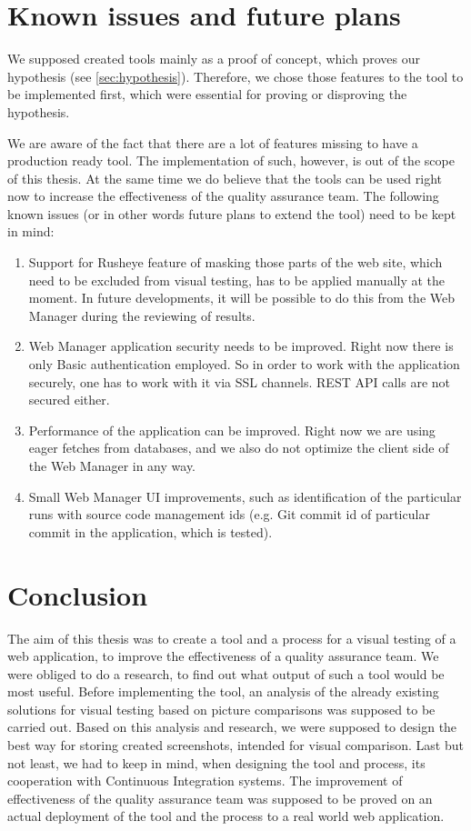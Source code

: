 \documentclass[11pt,oneside,final]{fithesis2}
\begin{document}
\chapter{Known issues and future plans}
We supposed created tools mainly as a proof of concept, which proves our hypothesis (see \ref{sec:hypothesis}). Therefore, we chose those features
to the tool to be implemented first, which were essential for proving or disproving the hypothesis.

We are aware of the fact that there are a lot of features missing to have a production ready tool. The implementation of such, however, is out
of the scope of this thesis. At the same time we do believe that the tools can be used right now to increase the effectiveness of the quality assurance
team. The following known issues (or in other words future plans to extend the tool) need to be kept in mind:

\begin{enumerate}
 \item Support for Rusheye feature of masking those parts of the web site, which need to be excluded from visual testing, has to be applied
 manually at the moment. In future developments, it will be possible to do this from the Web Manager during the reviewing of results.
 \item Web Manager application security needs to be improved. Right now there is only Basic authentication employed. So in order to work
 with the application securely, one has to work with it via SSL channels. REST API calls are not secured either.
 \item Performance of the application can be improved. Right now we are using eager fetches from databases, and we also do not optimize
 the client side of the Web Manager in any way.
 \item Small Web Manager UI improvements, such as identification of the particular runs with source code management ids (e.g. Git commit id of
 particular commit in the application, which is tested).
\end{enumerate}


\label{sec:plannedExtensions}
  
\chapter{Conclusion}
The aim of this thesis was to create a tool and a process for a visual testing of a web application, to improve the effectiveness of a 
quality assurance team. We were obliged to do a research, to find out what output of such a tool would be most useful. Before implementing
the tool, an analysis of the already existing solutions for visual testing based on picture comparisons was supposed to be carried out.
Based on this analysis and research, we were supposed to design the best way for storing created screenshots, intended for visual comparison.
Last but not least, we had to keep in mind, when designing the tool and process, its cooperation with Continuous Integration systems.
The improvement of effectiveness of the quality assurance team was supposed to be proved on an actual deployment of the tool and the 
process to a real world web application.
\end{document}

